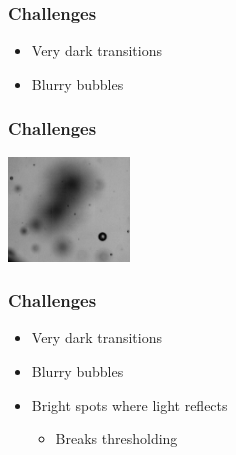 \documentclass{beamer}
\begin{document}
\begin{frame}
    \frametitle{Challenges}
    \begin{itemize}
        \item Very dark transitions
        \item Blurry bubbles
    \end{itemize}
\end{frame}

\begin{frame}
    \frametitle{Challenges}
    \begin{center}
        \includegraphics[width=0.8\columnwidth]{blurry-bubble}
    \end{center}
\end{frame}

\begin{frame}
    \frametitle{Challenges}
    \begin{itemize}
        \item Very dark transitions
        \item Blurry bubbles
        \item Bright spots where light reflects
        \begin{itemize}
            \item Breaks thresholding
        \end{itemize}
    \end{itemize}
\end{frame}
\end{document}
